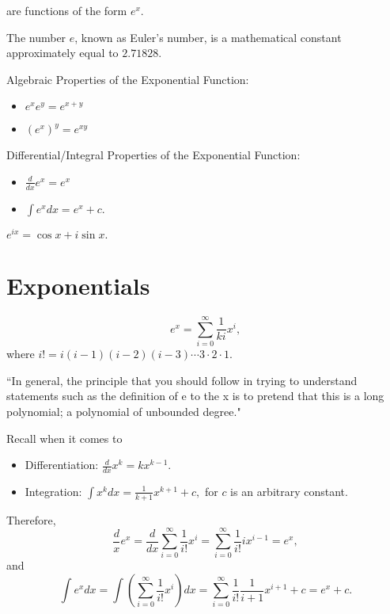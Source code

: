 \bigskip \noindent {} are functions of the form $e^{x}.$

\begin{definition}[$e$]
The number $e$, known as Euler's number, is a mathematical constant approximately equal to $2.71828.$
\end{definition}
Algebraic Properties of the Exponential Function:
\begin{itemize}
    \item $e^xe^y = e^{x + y}$
    \item $(e^x)^y = e^{xy}$
\end{itemize}
Differential/Integral Properties of the Exponential Function:
\begin{itemize}
    \item $\frac{d}{dx} e^x = e^x$
    \item $\int e^xdx = e^x + c.$
\end{itemize}
\begin{theorem}
$e^{ix} = \cos x + i \sin x.$
\end{theorem}

\section{Exponentials}
\begin{defn}[$e^x$]
\[e^x = \sum_{i = 0}^{\infty} \frac{1}{ki}x^{i},\] where $i! = i(i - 1)(i - 2)(i - 3)\cdots3\cdot2\cdot1.$
\end{defn}
\begin{center}
    ``In general, the principle that you should follow in trying to understand statements such as the definition of e to the x is to pretend that this is a long polynomial; a polynomial of unbounded degree."
\end{center}
Recall when it comes to
\begin{itemize}
    \item Differentiation: $\frac{d}{dx} x^{k} = kx^{k - 1}.$
    \item Integration: $\int x^{k}dx = \frac{1}{k + 1}x^{k + 1} + c,$ for $c$ is an arbitrary constant.  
\end{itemize}
Therefore, \[\frac{d}{x} e^x = \frac{d}{dx} \sum_{i = 0}^{\infty} \frac{1}{i!}x^{i} = \sum_{i = 0}^{\infty} \frac{1}{i!} ix^{i - 1} = e^{x},\] and \[\int e^{x}dx = \int\left(\sum_{i = 0}^{\infty} \frac{1}{i!}x^{i}\right)dx = \sum_{i = 0}^{\infty} \frac{1}{i!}\frac{1}{i + 1}x^{i + 1} + c = e^{x} + c.\]

